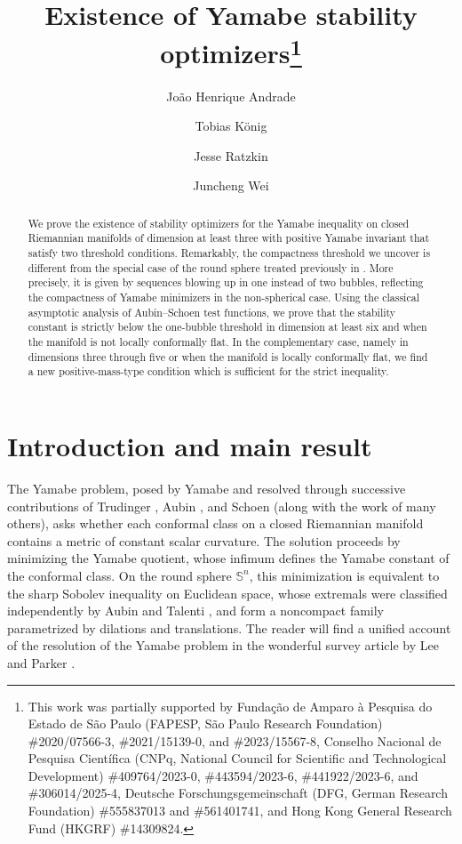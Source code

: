 \documentclass[reqno,11pt]{amsart}
\title[Yamabe stability optimizers]{Existence of Yamabe stability 
optimizers\thanks{This work was partially supported by Fundação de Amparo à Pesquisa 
do Estado de São Paulo (FAPESP, S\~ao Paulo Research Foundation) \#2020/07566-3, 
\#2021/15139-0, and \#2023/15567-8, Conselho Nacional de Pesquisa Científica 
(CNPq, National Council for Scientific and Technological Development) \#409764/2023-0, 
\#443594/2023-6, \#441922/2023-6, and \#306014/2025-4,
Deutsche Forschungsgemeinschaft (DFG, German Research Foundation) \#555837013 and \#561401741, and
Hong Kong General Research Fund (HKGRF) \#14309824.}}
\author[J.\,H.\,Andrade]{Jo\~ao Henrique Andrade}
\author[T.\,K\"onig]{Tobias K\"onig}
\author[J.\,Ratzkin]{Jesse Ratzkin}
\author[J.\,Wei]{Juncheng Wei}
\date{}
\numberwithin{equation}{section}
\theoremstyle{definition}
\theoremstyle{remark}
\begin{document}
\begin{abstract}
We prove the existence of stability optimizers for the Yamabe inequality on closed Riemannian 
manifolds of dimension at least three with positive Yamabe invariant that satisfy two threshold 
conditions. Remarkably, the compactness threshold 
we uncover is different from the special case of the round sphere treated previously in \cite{arXiv:2211.14185}.
More precisely, it is given by sequences blowing up in one instead of two bubbles, reflecting the compactness of 
Yamabe minimizers in the non-spherical case.
Using the classical asymptotic analysis of Aubin--Schoen test functions, we prove that the stability constant 
is strictly below the one-bubble threshold in dimension at least six and when the manifold is not locally 
conformally flat. In the complementary case, namely in dimensions three through five or when the manifold 
is locally conformally flat, we find a new positive-mass-type condition which is sufficient for the strict 
inequality.
\end{abstract}

\maketitle

\section{Introduction and main result}\label{sec:intro}

The Yamabe problem, posed by Yamabe \cite{Yam} and resolved through successive 
contributions of Trudinger \cite{Tru}, Aubin \cite{Aub}, and Schoen \cite{Sch1} (along 
with the work of many others), 
asks whether each conformal class on a closed Riemannian manifold contains a metric 
of constant scalar curvature. The solution proceeds by minimizing the Yamabe quotient, 
whose infimum defines the Yamabe constant of the conformal class. 
On 
the round sphere $\mathbb S^n$, this minimization is equivalent to the sharp Sobolev 
inequality on Euclidean space, whose extremals were classified independently by 
Aubin \cite{Aub} and Talenti \cite{Tal}, and form a noncompact family parametrized 
by dilations and translations. The reader will find a unified account of the 
resolution of the Yamabe problem in the wonderful survey article by Lee and 
Parker \cite{LP}.
\end{document}
